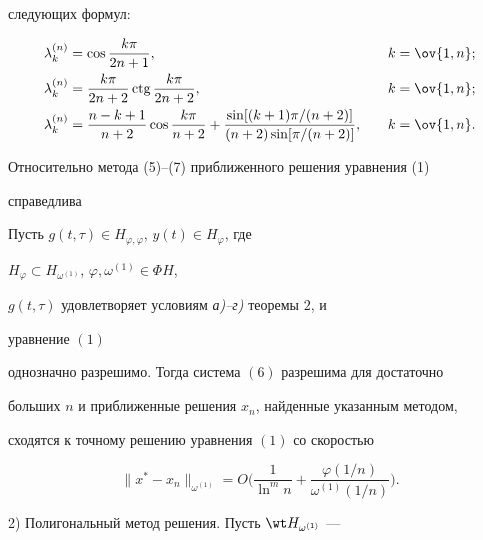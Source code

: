 следующих формул:


\begin{alignat*}{2}


\lambda^{(n)}_k&=\cos\frac{k\pi}{2n+1}, &\quad & k=\ov{1,n}; \\


%


\lambda^{(n)}_k&= \frac{k\pi}{2n+2}\text{\,ctg\,}


\frac{k\pi}{2n+2}, &\quad & k=\ov{1,n}; \\


%


\lambda^{(n)}_k& = \frac{n-k+1}{n+2}\cos\frac{k\pi}{n+2}+


\frac{\sin[(k+1)\pi/(n+2)]}


{(n+2)\sin[\pi/(n+2)]}, &\quad & k=\ov{1,n}.


\end{alignat*}





Относительно метода (5)--(7) приближенного решения уравнения (1) 


справедлива





\begin{thm}


Пусть $g(t,\tau)\in H_{\varphi,\varphi}$, $y(t)\in H_\varphi$, где 


$H_\varphi\subset H_{\omega^{(1)}}$, $\varphi,\omega^{(1)}\in\Phi H$, 


$g(t,\tau)$ удовлетворяет условиям {\em а)--г)} теоремы $2$, и 


уравнение $(1)$ 


однозначно разрешимо. Тогда система $(6)$ разрешима для достаточно 


больших $n$ и приближенные решения $x_n$, найденные указанным методом, 


сходятся к точному решению уравнения $(1)$ со скоростью


$$


\|x^*-x_n\|_{\omega^{(1)}}=O\bigg(\frac{1}{\ln^m n}+


\frac{\varphi(1/n)}{\omega^{(1)}(1/n)}\bigg).


$$


\end{thm}





2) Полигональный метод решения. Пусть $\wt H_{\omega^{(1)}}$ --- 



